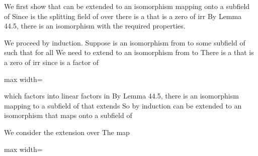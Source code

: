 \documentclass[11pt,oneside]{article}
\begin{document}
\begin{BookBody}

 We first show that \BookInline{\sigma } can be extended to an isomorphism mapping  onto a subfield of  Since  is the splitting field of  over  there is a  that is a zero of irr By Lemma 44.5, there is an isomorphism \BookInline{\tau } with the required properties.

We proceed by induction. Suppose \BookInline{\tau } is an isomorphism from  to some subfield of  such that \BookInline{\tau (\alpha )= \sigma (\alpha )} for all  We need to extend \BookInline{\tau } to an isomorphism from  to  There is a  that is a zero of irr since  is a factor of

\begin{center}\begin{adjustbox}{max width=\linewidth}\end{adjustbox}\end{center}

\noindent which factors into linear factors in  By Lemma 44.5, there is an isomorphism \BookInline{\tau ^{\prime }} mapping  to a subfield of  that extends  So by induction\BookInline{,\allowbreak \sigma } can be extended to an isomorphism that maps  onto a subfield of \BookEnd{\blacklozenge}

 We consider the extension  over  The map

\begin{center}\begin{adjustbox}{max width=\linewidth}\end{adjustbox}\end{center}


\end{BookBody}
\end{document}
